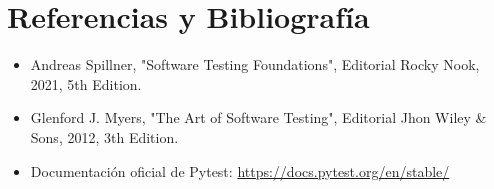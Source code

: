 \documentclass{article}
\begin{document}
\clearpage

\section{Referencias y Bibliografía}
\begin{itemize}			
	\item [1] Andreas Spillner, "Software Testing Foundations", Editorial Rocky Nook, 2021, 5th Edition.
    \item [2] Glenford J. Myers, "The Art of Software Testing", Editorial Jhon Wiley \& Sons, 2012, 3th Edition.
    \item [3] Documentación oficial de Pytest: \url{https://docs.pytest.org/en/stable/}
\end{itemize}	
			
\end{document}
